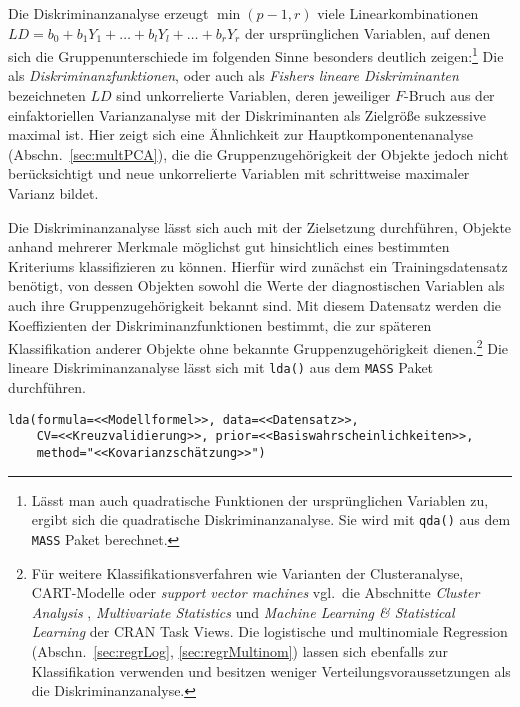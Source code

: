 Die Diskriminanzanalyse erzeugt $\min({p-1, r})$ viele Linearkombinationen $LD = b_{0} + b_{1} Y_{1} + {\dots} + b_{l} Y_{l} + {\dots} + b_{r} Y_{r}$ der ursprünglichen Variablen, auf denen sich die Gruppenunterschiede im folgenden Sinne besonders deutlich zeigen:\footnote{Lässt man auch quadratische Funktionen der ursprünglichen Variablen zu, ergibt sich die quadratische Diskriminanzanalyse. Sie wird mit \lstinline!qda()! aus dem \lstinline!MASS! Paket berechnet.} Die als \emph{Diskriminanzfunktionen}, oder auch als \emph{Fishers lineare Diskriminanten} bezeichneten $LD$ sind unkorrelierte Variablen, deren jeweiliger $F$-Bruch aus der einfaktoriellen Varianzanalyse mit der Diskriminanten als Zielgröße sukzessive maximal ist. Hier zeigt sich eine Ähnlichkeit zur Hauptkomponentenanalyse (Abschn.\ \ref{sec:multPCA}), die die Gruppenzugehörigkeit der Objekte jedoch nicht berücksichtigt und neue unkorrelierte Variablen mit schrittweise maximaler Varianz bildet.

Die Diskriminanzanalyse lässt sich auch mit der Zielsetzung durchführen, Objekte anhand mehrerer Merkmale möglichst gut hinsichtlich eines bestimmten Kriteriums klassifizieren zu können. Hierfür wird zunächst ein Trainingsdatensatz benötigt, von dessen Objekten sowohl die Werte der diagnostischen Variablen als auch ihre Gruppenzugehörigkeit bekannt sind. Mit diesem Datensatz werden die Koeffizienten der Diskriminanzfunktionen bestimmt, die zur späteren Klassifikation anderer Objekte ohne bekannte Gruppenzugehörigkeit dienen.\footnote{\label{ftn:classification}Für weitere Klassifikationsverfahren wie Varianten der Clusteranalyse, CART-Modelle oder \emph{support vector machines} vgl.\ die Abschnitte \emph{Cluster Analysis} \cite{CRANtvCluster}, \emph{Multivariate Statistics} \cite{CRANtvMultivariate} und \emph{Machine Learning \& Statistical Learning} \cite{CRANtvMachine} der CRAN Task Views. Die logistische und multinomiale Regression (Abschn.\ \ref{sec:regrLog}, \ref{sec:regrMultinom}) lassen sich ebenfalls zur Klassifikation verwenden und besitzen weniger Verteilungsvoraussetzungen als die Diskriminanzanalyse.} Die lineare Diskriminanzanalyse lässt sich mit \lstinline!lda()! aus dem \lstinline!MASS! Paket durchführen.
\begin{lstlisting}
lda(formula=<<Modellformel>>, data=<<Datensatz>>,
    CV=<<Kreuzvalidierung>>, prior=<<Basiswahrscheinlichkeiten>>,
    method="<<Kovarianzschätzung>>")
\end{lstlisting}

